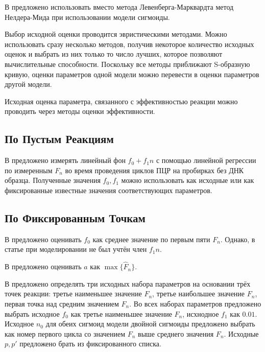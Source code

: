 В \cite{liuProgressCurveAnalysis2011, goudarRobustParameterEstimation2009}
предложено использовать вместо метода Левенберга\hyp{}Марквардта метод Нелдера-Мида
при использовании модели сигмоиды.

Выбор исходной оценки проводится эвристическими методами. Можно использовать
сразу несколько методов, получив некоторое количество исходных оценок и
выбрать из них только то число лучших, которое позволяют вычислительные
способности. Поскольку все методы приближают S-образную кривую, оценки
параметров одной модели можно перевести в оценки параметров другой модели.

Исходная оценка параметра, связанного с эффективностью реакции можно проводить
через методы оценки эффективности.

\subsection{По Пустым Реакциям}

В \cite{peccoudStatisticalEstimationsPCR1998} предложено измерять линейный фон
$f_0+f_1n$ с помощью линейной регрессии по измеренным $F_{n}$ во время
проведения циклов ПЦР на пробирках без ДНК образца. Полученные значения
$f_0,f_1$ можно использовать как исходные или как фиксированные известные
значения соответствующих параметров.

\subsection{По Фиксированным Точкам}\label{ssec:patent}

В \cite{barKineticOutlierDetection2003} предложено оценивать $f_0$ как среднее
значение по первым пяти $F_{n}$. Однако, в статье при моделировании не был
учтён член $f_1n$.

В \cite{liuProgressCurveAnalysis2011} предложено оценивать $a$ как
$\max\{\hat{F}_{n}\}$.

В \cite{kurnikPCRElbowDetermination2007,kurnikPCRElbowDetermination2011}
предложено определять три исходных набора параметров на основании трёх точек
реакции: третье наименьшее значение $F_{n}$, третье наибольшее значение
$F_{n}$, первая точка над средним значением $F_{n}$. Во всех наборах параметров
предложено выбрать исходное $f_0$ как третье наименьшее значение $F_{n}$,
исхнодное $f_1$ как $0.01$. Исходное $n_0$ для обеих сигмоид модели двойной
сигмоиды предложено выбрать как номер первого цикла со значением $F_{n}$ выше
среднего значения $F_{n}$. Исходные $p,p'$ предложено брать из фиксированного
списка.

